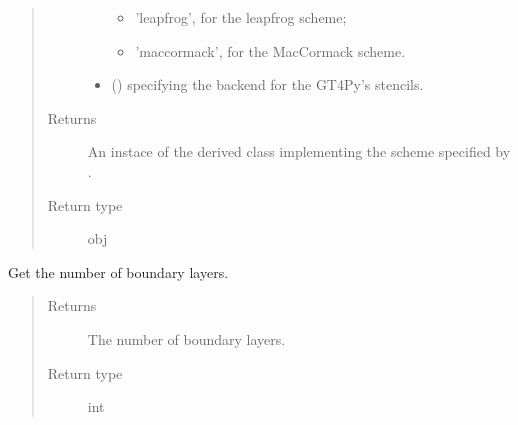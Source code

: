 \documentclass[letterpaper,10pt,english]{sphinxmanual}
\begin{document}
\begin{fulllineitems}
\begin{fulllineitems}
\begin{quote}
\begin{description}
\begin{itemize}
\begin{itemize}
\item {} 
’leapfrog’, for the leapfrog scheme;

\item {} 
’maccormack’, for the MacCormack scheme.

\end{itemize}


\item {} 
 () \textendash{}  specifying the backend for the GT4Py’s stencils.

\end{itemize}

\item[{Returns}] \leavevmode
An instace of the derived class implementing the scheme specified by .

\item[{Return type}] \leavevmode
obj

\end{description}\end{quote}

\end{fulllineitems}


\begin{fulllineitems}
\label{\detokenize{api:dycore.prognostic_isentropic.PrognosticIsentropic.nb}}
Get the number of boundary layers.
\begin{quote}\begin{description}
\item[{Returns}] \leavevmode
The number of boundary layers.

\item[{Return type}] \leavevmode
int

\end{description}\end{quote}

\end{fulllineitems}



\end{fulllineitems}
\end{document}
